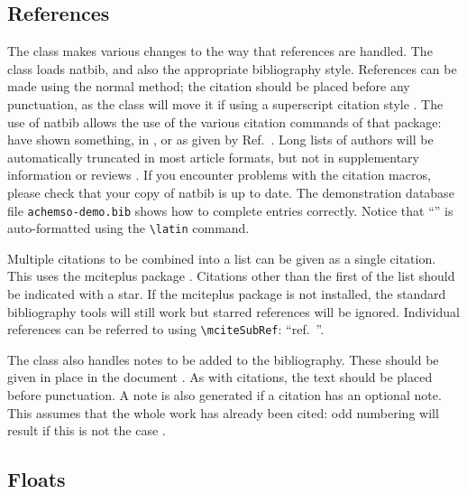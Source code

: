 \documentclass[journal=jacsat,manuscript=article]{achemso}
\begin{document}
\subsection{References}

The class makes various changes to the way that references are
handled.  The class loads \textsf{natbib}, and also the
appropriate bibliography style.  References can be made using
the normal method; the citation should be placed before any
punctuation, as the class will move it if using a superscript
citation style
\cite{Mena2000,Abernethy2003,Friedman-Hill2003,EuropeanCommission2008}.
The use of \textsf{natbib} allows the use of the various citation
commands of that package: \citeauthor{Abernethy2003} have shown
something, in \citeyear{Cotton1999}, or as given by
Ref.~.  Long lists of authors will be
automatically truncated in most article formats, but not in
supplementary information or reviews \cite{Pople2003}. If you
encounter problems with the citation macros, please check that
your copy of \textsf{natbib} is up to date. The demonstration
database file \texttt{achemso-demo.bib} shows how to complete
entries correctly. Notice that ``'' is auto-formatted
using the \texttt{\textbackslash latin} command.

Multiple citations to be combined into a list can be given as
a single citation.  This uses the \textsf{mciteplus} package
\cite{Johnson1972,*Arduengo1992,*Eisenstein2005,*Arduengo1994}.
Citations other than the first of the list should be indicated
with a star. If the \textsf{mciteplus} package is not installed,
the standard bibliography tools will still work but starred
references will be ignored. Individual references can be referred
to using \texttt{\textbackslash mciteSubRef}:
``ref.~''.

The class also handles notes to be added to the bibliography.  These
should be given in place in the document .  As with
citations, the text should be placed before punctuation.  A note is
also generated if a citation has an optional note.  This assumes that
the whole work has already been cited: odd numbering will result if
this is not the case \cite[p.~1]{Cotton1999}.

\subsection{Floats}
\end{document}
